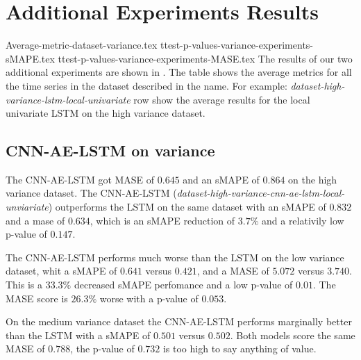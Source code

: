 \section{Additional Experiments Results}
\label{section:Results:AdditionalExperimentResults}

{Average-metric-dataset-variance.tex}
{ttest-p-values-variance-experiments-sMAPE.tex}
{ttest-p-values-variance-experiments-MASE.tex}
The results of our two additional experiments are shown in .
The table shows the average metrics for all the time series in the dataset described in the name.
For example: \textit{dataset-high-variance-lstm-local-univariate} row show the average
results for the local univariate LSTM on the high variance dataset.

\subsection{CNN-AE-LSTM on variance}
The CNN-AE-LSTM got MASE of $0.645$ and an sMAPE of $0.864$
on the high variance dataset. The CNN-AE-LSTM (\textit{dataset-high-variance-cnn-ae-lstm-local-unviariate}) outperforms the LSTM on
the same dataset with an sMAPE of $0.832$ and a mase of $0.634$, which is an sMAPE reduction of $3.7\%$
and a relativily low p-value of $0.147$.

The CNN-AE-LSTM performs much worse than the LSTM on the low variance dataset,
whit a sMAPE of $0.641$ versus $0.421$, and a MASE of $5.072$ versus $3.740$.
This is a $33.3\%$ decreased sMAPE perfomance and a low p-value of $0.01$.
The MASE score is $26.3\%$ worse with a p-value of $0.053$.

On the medium variance dataset the CNN-AE-LSTM performs marginally better than the LSTM
with a sMAPE of $0.501$ versus $0.502$. Both models score the same MASE of $0.788$, the
p-value of $0.732$ is too high to say anything of value.



